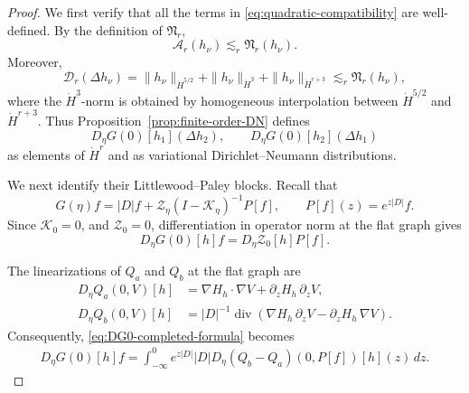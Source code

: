 \documentclass[12pt]{amsart}
\theoremstyle{remark}
\theoremstyle{definition}
\numberwithin{equation}{section}
\begin{document}
\begin{proof}
We first verify that all the terms in
\eqref{eq:quadratic-compatibility} are well-defined. By the definition
of \(\mathfrak N_r\),
\[
 \mathcal A_r(h_\nu)
 \lesssim_r \mathfrak N_r(h_\nu).
\]
Moreover,
\[
 \mathcal D_r(\Delta h_\nu)
 = \|h_\nu\|_{\dot H^{5/2}} + \|h_\nu\|_{\dot H^3} + \|h_\nu\|_{\dot H^{r+3}} \lesssim_r \mathfrak N_r(h_\nu),
\]
where the \(\dot H^3\)-norm is obtained by homogeneous
interpolation between \(\dot H^{5/2}\) and \(\dot H^{r+3}\).
Thus Proposition~\ref{prop:finite-order-DN} defines
\[
 D_\eta G(0)[h_1](\Delta h_2),
 \qquad D_\eta G(0)[h_2](\Delta h_1)
\]
as elements of \(\dot H^r\) and as variational
Dirichlet--Neumann distributions.

We next identify their Littlewood--Paley blocks. Recall that
\[
 G(\eta)f = |D|f + \mathcal Z_\eta
 (I-\mathcal K_\eta)^{-1}P[f],
 \qquad P[f](z)=e^{z|D|}f.
\]
Since $\mathcal K_0=0$, and 
 $\mathcal Z_0=0$, differentiation in operator norm at the flat graph gives
\begin{equation} \label{eq:DG0-completed-formula}
 D_\eta G(0)[h]f = D_\eta\mathcal Z_0[h]P[f].
\end{equation}

The linearizations of \(Q_a\) and \(Q_b\) at the flat graph are
\begin{align}\label{eq:Qa-linearization-flat}
 D_\eta Q_a(0,V)[h]
 &= \nabla H_h\cdot\nabla V + \partial_zH_h\,\partial_zV,\\
\label{eq:Qb-linearization-flat}
 D_\eta Q_b(0,V)[h]
 &= |D|^{-1}\operatorname{div}
 \left( \nabla H_h\,\partial_zV  -  \partial_zH_h\,\nabla V
 \right).
\end{align}
Consequently, \eqref{eq:DG0-completed-formula} becomes
\begin{align}
\label{eq:DG0-Duhamel-formula}
 D_\eta G(0)[h]f = \int_{-\infty}^0 e^{z|D|}|D| D_\eta(Q_b-Q_a)(0,P[f])[h](z)\,dz.
\end{align}


\end{proof}
\end{document}
